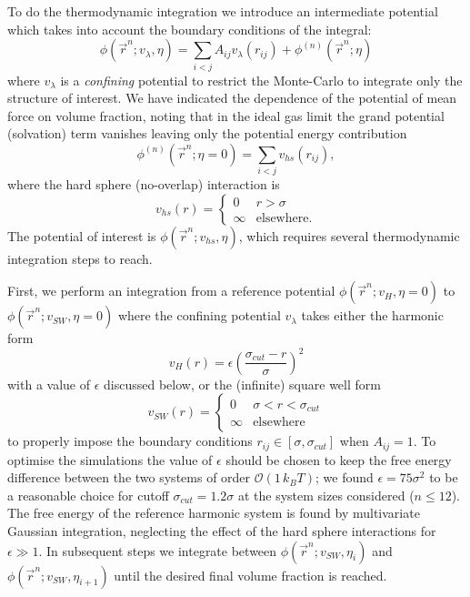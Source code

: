 \documentclass[11pt,twoside]{report}
\begin{document}
To do the thermodynamic integration we introduce an intermediate potential which takes into account the boundary conditions of the integral:
\begin{equation}
  \phi(\vec{r}^n; v_\lambda, \eta) =
  \sum_{i < j} A_{ij} v_\lambda(r_{ij})
  + \phi^{(n)}(\vec{r}^n; \eta)
\end{equation}
where $v_\lambda$ is a \emph{confining} potential to restrict the Monte-Carlo to integrate only the structure of interest.
We have indicated the dependence of the potential of mean force on volume fraction, noting that in the ideal gas limit the grand potential (solvation) term vanishes leaving only the potential energy contribution
\begin{equation}
  \phi^{(n)}(\vec{r}^n; \eta=0) = \sum_{i < j} v_{hs}(r_{ij}),
\end{equation}
where the hard sphere (no-overlap) interaction is
\begin{equation}
  v_{hs}(r) =
  \begin{cases}
    0 &r > \sigma \\
    \infty &\textrm{elsewhere}.
  \end{cases}
\end{equation}
The potential of interest is $\phi(\vec{r}^n; v_{hs}, \eta)$, which requires several thermodynamic integration steps to reach.

First, we perform an integration from a reference potential $\phi(\vec{r}^n; v_H, \eta=0)$ to $\phi(\vec{r}^n; v_{SW}, \eta=0)$ where the confining potential $v_\lambda$ takes either the harmonic form
\begin{equation}
  v_H(r) = \epsilon \left(\frac{\sigma_{cut} - r}{\sigma}\right)^2
\end{equation}
with a value of $\epsilon$ discussed below, or the (infinite) square well form
\begin{equation}
  v_{SW}(r) =
  \begin{cases}
    0 &\sigma < r < \sigma_{cut} \\
    \infty &\textrm{elsewhere}
  \end{cases}
\end{equation}
to properly impose the boundary conditions $r_{ij} \in [\sigma, \sigma_{cut}]$ when $A_{ij} = 1$.
To optimise the simulations the value of $\epsilon$ should be chosen to keep the free energy difference between the two systems of order $\mathcal{O}(1 \, k_B T)$; we found $\epsilon = 75\sigma^2$ to be a reasonable choice for cutoff $\sigma_{cut} = 1.2\sigma$ at the system sizes considered ($n \le 12$).
The free energy of the reference harmonic system is found by multivariate Gaussian integration, neglecting the effect of the hard sphere interactions for $\epsilon \gg 1$.
In subsequent steps we integrate between $\phi(\vec{r}^n; v_{SW}, \eta_i)$ and $\phi(\vec{r}^n; v_{SW}, \eta_{i+1})$ until the desired final volume fraction is reached.
\end{document}
